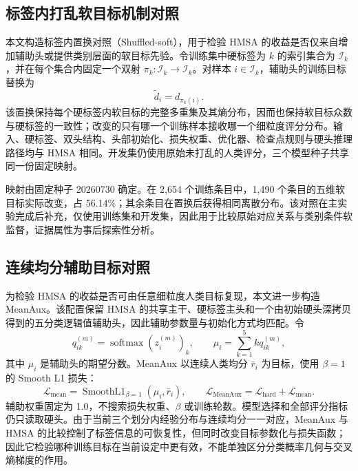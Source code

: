 \documentclass[UTF8,fontset=fandol,a4paper,11pt]{ctexart}
\begin{document}
\subsection{标签内打乱软目标机制对照}

本文构造标签内置换对照（Shuffled-soft），用于检验 HMSA 的收益是否仅来自增加辅助头或提供类别层面的软目标先验。令训练集中硬标签为 $k$ 的索引集合为 $\mathcal{I}_k$，并在每个集合内固定一个双射 $\pi_k:\mathcal{I}_k\rightarrow\mathcal{I}_k$。对样本 $i\in\mathcal{I}_k$，辅助头的训练目标替换为
\begin{equation}
\tilde d_i=d_{\pi_k(i)}.
\end{equation}
该置换保持每个硬标签内软目标的完整多重集及其熵分布，因而也保持软目标众数与硬标签的一致性；改变的只有哪一个训练样本接收哪一个细粒度评分分布。输入、硬标签、双头结构、头部初始化、损失权重、优化器、检查点规则与硬头推理路径均与 HMSA 相同。开发集仍使用原始未打乱的人类评分，三个模型种子共享同一份固定映射。

映射由固定种子 20260730 确定。在 2,654 个训练条目中，1,490 个条目的五维软目标实际改变，占 56.14\%；其余条目在置换后获得相同离散分布。该对照在主实验完成后补充，仅使用训练集和开发集，因此用于比较原始对应关系与类别条件软监督，证据属性为事后探索性分析。

\subsection{连续均分辅助目标对照}

为检验 HMSA 的收益是否可由任意细粒度人类目标复现，本文进一步构造 MeanAux。该配置保留 HMSA 的共享主干、硬标签主头和一个由初始硬头深拷贝得到的五分类逻辑值辅助头，因此辅助参数量与初始化方式均匹配。令
\begin{equation}
q_{ik}^{(m)}=\operatorname{softmax}(z_i^{(m)})_k,
\qquad
\mu_i=\sum_{k=1}^{5}kq_{ik}^{(m)},
\end{equation}
其中 $\mu_i$ 是辅助头的期望分数。MeanAux 以连续人类均分 $\bar r_i$ 为目标，使用 $\beta=1$ 的 Smooth L1 损失：
\begin{equation}
\mathcal{L}_{\mathrm{mean}}=
\operatorname{SmoothL1}_{\beta=1}(\mu_i,\bar r_i),
\qquad
\mathcal{L}_{\mathrm{MeanAux}}=
\mathcal{L}_{\mathrm{hard}}+\mathcal{L}_{\mathrm{mean}}.
\end{equation}
辅助权重固定为 1.0，不搜索损失权重、$\beta$ 或训练轮数。模型选择和全部评分指标仍只读取硬头。由于当前三个划分内经验分布与连续均分一一对应，MeanAux 与 HMSA 的比较控制了标签信息的可恢复性，但同时改变目标参数化与损失函数；因此它检验哪种训练目标在当前设定中更有效，不能单独区分分类概率几何与交叉熵梯度的作用。
\end{document}
